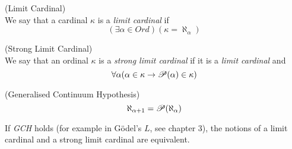 \begin{definition}{(Limit Cardinal)}\label{def:limit_ordinal}\\
We say that a cardinal $\kappa$ is a \emph{limit cardinal} if
\begin{equation}
(\exists \alpha \in Ord)(\kappa = \aleph_\alpha)
\end{equation}
\end{definition}

\begin{definition}{(Strong Limit Cardinal)}\label{def:limit_ordinal}\\
We say that an ordinal $\kappa$ is a \emph{strong limit cardinal} if it is a \emph{limit cardinal} and 
\begin{equation}
\forall \alpha (\alpha \in \kappa \rightarrow \mathscr{P} (\alpha) \in \kappa)
\end{equation}
\end{definition}

\begin{definition}{(Generalised Continuum Hypothesis)}\\
\begin{equation}
\aleph_{\alpha+1}=\mathscr{P} (\aleph_\alpha)
\end{equation}
\end{definition}
If \emph{GCH} holds (for example in Gödel's $L$, see chapter 3), the notions of a limit cardinal and a strong limit cardinal are equivalent.

\

